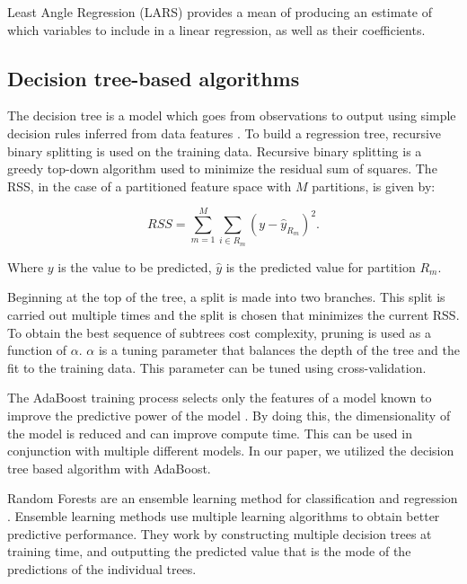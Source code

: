 \documentclass[final,3p,times,twocolumn,numbers]{elsarticle}
\begin{document}
Least Angle Regression (LARS) provides a mean of producing an estimate of which variables to include in a linear regression, as well as their coefficients.


%



\subsection{Decision tree-based algorithms}

The decision tree is a model which goes from observations to output using simple decision rules inferred from data features \cite{Quinlan}. To build a regression tree, recursive binary splitting is used on the training data. Recursive binary splitting is a greedy top-down algorithm used to minimize the residual sum of squares. The RSS, in the case of a partitioned feature space with $M$ partitions, is given by:

\begin{equation}
    RSS=\sum^M_{m=1}\sum_{i\in R_m}(y-\hat{y}_{R_m})^2.
\end{equation}

\noindent Where $y$ is the value to be predicted, $\hat{y}$ is the predicted value for partition $R_m$.



Beginning at the top of the tree, a split is made into two branches. This split is carried out multiple times and the split is chosen that minimizes the current RSS. To obtain the best sequence of subtrees cost complexity, pruning is used as a function of $\alpha$. $\alpha$ is a tuning parameter that balances the depth of the tree and the fit to the training data. This parameter can be tuned using cross-validation.


The AdaBoost training process selects only the features of a model known to improve the predictive power of the model \cite{Freund1997}. By doing this, the dimensionality of the model is reduced and can improve compute time. This can be used in conjunction with multiple different models. In our paper, we utilized the decision tree based algorithm with AdaBoost.


Random Forests are an ensemble learning method for classification and regression \cite{Breiman2001}. Ensemble learning methods use multiple learning algorithms to obtain better predictive performance. They work by constructing multiple decision trees at training time, and outputting the predicted value that is the mode of the predictions of the individual trees.
\end{document}
